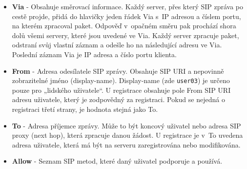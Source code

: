 \begin{itemize}
    \item {\bf Via} - Obsahuje směrovací informace. Každý server, přes který SIP zpráva po cestě projde,
    přidá do hlavičky jeden řádek Via s IP adresou a číslem portu, na kterém zpracoval paket. Odpověď v opačném
    směru pak prochází shora dolů všemi servery, které jsou uvedené ve Via. Každý server zpracuje paket,
    odstraní svůj vlastní záznam a odešle ho na následující adresu ve Via. Poslední záznam Via je IP adresa
    a číslo portu klienta.
    \begin{figure}[h!]
        \centering
    \end{figure}
    
    \item {\bf From} - Adresa odesílatele SIP zprávy. Obsahuje SIP URI a nepovinně zobrazitelné jméno (display-name).
    Display-name (zde {\tt user03}) je určeno pouze pro „lidského uživatele“.
    U registrace obsahuje pole From SIP URI adresu uživatele, který je zodpovědný za registraci. Pokud se nejedná o registraci třetí strany, je hodnota stejná jako To.
    \begin{figure}[h!]
        \centering
    \end{figure}

    
    \item {\bf To} - Adresa příjemce zprávy. Může to být koncový uživatel nebo adresa SIP proxy (next hop), která zpracuje danou žádost.
    U registrace je v To uvedena adresa uživatele, která má být na serveru zaregistrována nebo modifikována.
    \begin{figure}[h!]
        \centering
    \end{figure}
    
    \item {\bf Allow} - Seznam SIP metod, které daný uživatel podporuje a používá.
    \begin{figure}[h!]
        \centering
    \end{figure}
\end{itemize}

